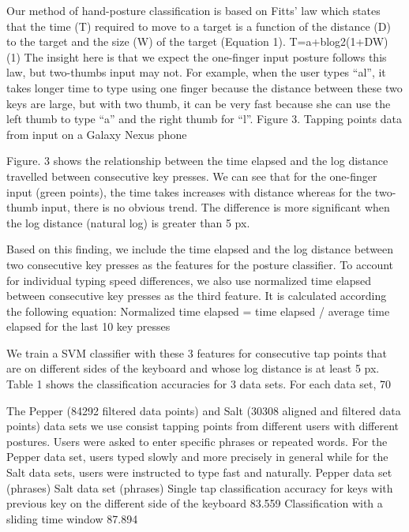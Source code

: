 \documentclass{sigchi}
\begin{document}
Our method of hand-posture classification is based on Fitts’ law which states that the time (T) required to move to a target is a function of the distance (D) to the target and the size (W) of the target (Equation 1).
T=a+blog2(1+DW)                                                  (1)
The insight here is that we expect the one-finger input posture follows this law,  but two-thumbs input may not. For example, when the user types “al”, it takes longer time to type using one finger because the distance between these two keys are large, but with two thumb, it can be very fast because she can use the left thumb to type “a” and the right thumb for “l”.
Figure 3. Tapping points data from input on a Galaxy Nexus phone

Figure. 3 shows the relationship between the time elapsed  and the log distance travelled between consecutive key presses. We can see that for the one-finger input (green points), the time takes increases with distance whereas for the two-thumb input, there is no obvious trend. The difference is more significant when the log distance (natural log) is greater than 5 px.

Based on this finding, we include the time elapsed and the log distance between two consecutive key presses as the features for the posture classifier. To account for individual typing speed differences, we also use normalized time elapsed between consecutive key presses as the third feature. It is calculated according the following equation:
Normalized time elapsed = time elapsed / average time elapsed for the last 10 key presses

We train a SVM classifier with these 3 features for consecutive tap points that are on different sides of the keyboard and whose log distance is at least 5 px. Table 1 shows the classification accuracies for 3 data sets. For each data set, 70%

The Pepper (84292 filtered data points) and Salt (30308 aligned and filtered data points) data sets we use consist tapping points from different users with different postures. Users were asked to enter specific phrases or repeated words. For the Pepper data set, users typed slowly and more precisely in general while for the Salt data sets, users were instructed to type fast and naturally.
Pepper data set (phrases) Salt data set (phrases)
Single tap classification accuracy for keys with previous key on the different side of the keyboard 83.559%
Classification with a sliding time window 87.894%
\end{document}
